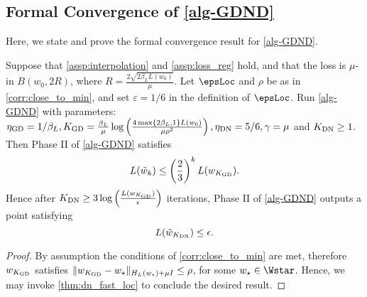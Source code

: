 \subsection{Formal Convergence of \cref{alg-GDND}}
\label{subsec:GDND_conv}
Here, we state and prove the formal convergence result for \cref{alg-GDND}.
\begin{theorem}
\label{thm:GDND}
    Suppose that \cref{assp:interpolation} and \cref{assp:loss_reg} hold, and that the loss is $\mu$-\PL in $B(w_0,2R)$, where $R = \frac{2\sqrt{2\beta_L L(w_0)}}{\mu}$.
    Let $\epsLoc$ and $\rho$ be as in \cref{corr:close_to_min}, and set $\varepsilon = 1/6$ in the definition of $\epsLoc$. 
    Run \cref{alg-GDND} with parameters: $\eta_{\textup{GD}} = 1/\beta_L, K_{\textup{GD}} = \frac{\beta_L}{\mu}\log\left(\frac{4\max\{2\beta_{L},1\}L(w_0)}{\mu\rho^2}\right), \eta_{\textup{DN}} = 5/6, \gamma = \mu$ and $K_{\textup{DN}}\geq 1$.
    Then Phase II of \cref{alg-GDND} satisfies
    \[
    L(\tilde w_{k})\leq \left(\frac{2}{3}\right)^{k}L(w_{K_{\textup{GD}}}).
    \]
    Hence after $K_{\textup{DN}} \geq 3\log\left(\frac{L(w_{K_{\textup{GD}}})}{\epsilon}\right)$ iterations, Phase II of \cref{alg-GDND} outputs a point satisfying
    \[
     L(\tilde w_{K_{\textup{DN}}})\leq \epsilon.
    \]
\end{theorem}

\begin{proof}
    By assumption the conditions of \cref{corr:close_to_min} are met, therefore $w_{K_{\textup{GD}}}$ satisfies $\|w_{K_{\textup{GD}}}-w_\star\|_{H_L(w_\star)+\mu I}\leq \rho$, for some $w_\star \in \Wstar$.
    Hence, we may invoke \cref{thm:dn_fast_loc} to conclude the desired result. 
\end{proof}
